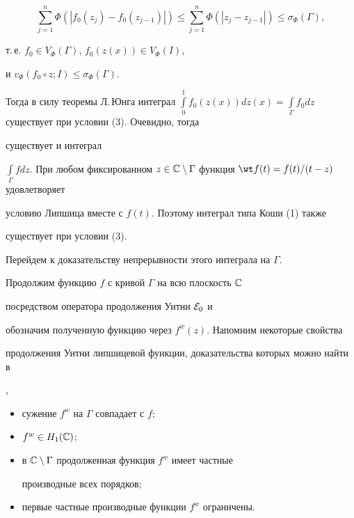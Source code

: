 $$


\sum_{j=1}^{n}\Phi(\left|f_{0}(z_{j})-f_{0}(z_{j-1})\right|)\le


\sum_{j=1}^{n}\Phi(|z_{j}-z_{j-1}|) \le \sigma_{\Phi}(\Gamma),


$$


т.\,е. $f_{0}\in V_{\Phi}(\Gamma)$, $f_{0}(z(x))\in V_{\Phi}(I)$,


и $v_{\Phi}(f_{0}\circ z; I)\le \sigma_{\Phi}(\Gamma)$.


Тогда в силу теоремы Л.\,Юнга интеграл $\int\limits_0^1{f_{0}(z(x))dz(x)} =


\int\limits_{\Gamma}{f_{0}dz}$ существует при условии (3). Очевидно, тогда


существует и интеграл


$\int\limits_{\Gamma}{fdz}$. При любом фиксированном $z\in


{\Bbb C}\setminus\Gamma$ функция $\wt f(t) = f(t)/(t - z)$ удовлетворяет


условию Липшица вместе с $f(t)$. Поэтому интеграл типа Коши (1) также


существует при условии (3).





Перейдем к доказательству непрерывности этого интеграла на $\Gamma$.


Продолжим функцию $f$ с кривой $\Gamma$ на всю плоскость ${\Bbb C}$


посредством оператора продолжения Уитни ${\cal E}_0$ \cite{St} и


обозначим полученную функцию через $f^w(z)$. Напомним некоторые свойства


продолжения Уитни липшицевой функции, доказательства которых можно найти в


\cite{St},


\begin{itemize}


\item[а)] сужение $f^w$ на $\Gamma$ совпадает с $f$;


\item[б)] $f^{w}\in H_{1}({\Bbb C})$;


\item[в)] в ${\Bbb C}\setminus\Gamma$ продолженная функция $f^w$ имеет частные


производные всех порядков;


\item[г)] первые частные производные функции $f^w$ ограничены.


\end{itemize}





